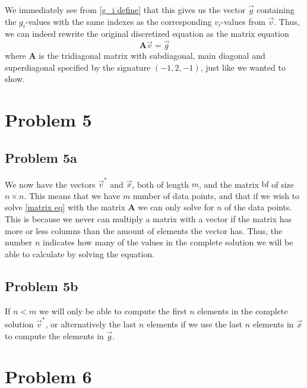 \documentclass[english,notitlepage]{revtex4-1}  %
\begin{document}
We immediately see from \cref{g_i define} that this gives us the vector $\vec{g}$ containing the $g_i$-values with the same indexes as the corresponding $v_i$-values from $\vec{v}$. Thus, we can indeed rewrite the original discretized equation as the matrix equation
\begin{equation}
    \textbf{A}\vec{v} = \vec{g} \label{matrix eq}
\end{equation}
where $\textbf{A}$ is the tridiagonal matrix with subdiagonal, main diagonal and superdiagonal specified by the signature $(-1, 2, -1)$, just like we wanted to show.


\section*{Problem 5}
\subsection*{Problem 5a}
We now have the vectors $\vec{v}^*$ and $\vec{x}$, both of length $m$, and the matrix $\text{bf}$ of size $n \times n$. This means that we have $m$ number of data points, and that if we wish to solve \cref{matrix eq} with the matrix $\textbf{A}$ we can only solve for $n$ of the data points. This is because we never can multiply a matrix with a vector if the matrix has more or less columns than the amount of elements the vector has. Thus, the number $n$ indicates how many of the values in the complete solution we will be able to calculate by solving the equation.

\subsection*{Problem 5b}
If $n < m$ we will only be able to compute the first $n$ elements in the complete solution $\vec{v}^*$, or alternatively the last $n$ elements if we use the last $n$ elements in $\vec{x}$ to compute the elements in $\vec{g}$.


\section*{Problem 6}
\end{document}
